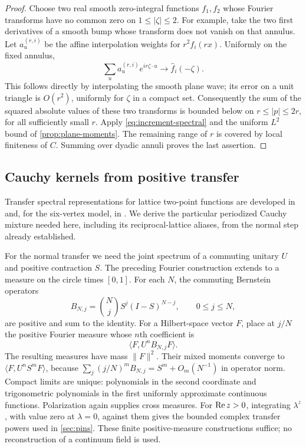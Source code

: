\begin{proof}
Choose two real smooth zero-integral functions \(f_1,f_2\) whose Fourier
transforms have no common zero on \(1\le|\zeta|\le2\). For example, take the
two first derivatives of a smooth bump whose transform does not vanish on that
annulus. Let \(a^{(r,i)}_u\) be the affine interpolation weights for
\(r^2f_i(rx)\). Uniformly on the fixed annulus,
\[
 \sum_u a^{(r,i)}_ue^{ir\zeta\cdot u}
        \longrightarrow \widehat f_i(-\zeta).
\]
This follows directly by interpolating the smooth plane wave; its error on a
unit triangle is \(O(r^2)\), uniformly for \(\zeta\) in a compact set.
Consequently the sum of the squared absolute values of these two transforms
is bounded below on \(r\le|p|\le2r\), for all sufficiently small \(r\).
Apply \cref{eq:increment-spectral} and the uniform \(L^2\) bound of
\cref{prop:plane-moments}. The remaining range of \(r\) is covered by local
finiteness of \(C\). Summing over dyadic annuli proves the last assertion.
\end{proof}

\subsection{Cauchy kernels from positive transfer}

Transfer spectral representations for lattice two-point functions are
developed in \cite{Usui2012} and, for the six-vertex model, in
\cite[Theorems~4.12 and 4.15]{DCKLM2026}.  We derive the particular
periodized Cauchy mixture needed here, including its reciprocal-lattice
aliases, from the normal step already established.

For the normal transfer we need the joint spectrum of a commuting unitary
$U$ and positive contraction $S$. The preceding Fourier construction
extends to a measure on the circle times $[0,1]$. For each $N$, the commuting
Bernstein operators
\[
 B_{N,j}=\binom Nj S^j(I-S)^{N-j},\qquad 0\le j\le N,
\]
are positive and sum to the identity. For a Hilbert-space vector $F$, place
at $j/N$ the positive Fourier measure whose $n$th coefficient is
\[
                    \langle F,U^nB_{N,j}F\rangle.
\]
The resulting measures have mass $\|F\|^2$. Their mixed moments converge
to $\langle F,U^nS^mF\rangle$, because
$\sum_j(j/N)^m B_{N,j}=S^m+O_m(N^{-1})$ in operator norm.
Compact limits are unique: polynomials in the second coordinate and
trigonometric polynomials in the first uniformly approximate continuous
functions. Polarization again supplies cross measures. For $\operatorname{Re} z>0$,
integrating $\lambda^z$, with value zero at $\lambda=0$, against them gives
the bounded complex transfer powers used in \cref{sec:pins}. These finite positive-measure
constructions suffice; no reconstruction of a continuum field is used.


